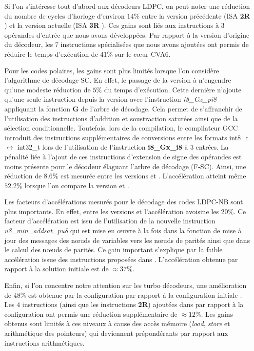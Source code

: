 \documentclass[../main.tex]{subfiles}
\begin{document}
Si l'on s'intéresse tout d'abord aux décodeurs LDPC, on peut noter une réduction du nombre de cycles d'horloge d'environ  $14\%$ entre la version précédente (ISA \textbf{2R} ) et la version actuelle (ISA \textbf{3R} ). 
Ces gains sont liés aux instructions à $3$ opérandes d'entrée que nous avons développées.
Par rapport à la version d'origine du décodeur, les $7$ instructions spécialisées que nous avons ajoutées ont permis de réduire le temps d'exécution de $41\%$ sur le cœur CVA6.


Pour les codes polaires, les gains sont plus limités lorsque l'on considère l'algorithme de décodage SC. 
En effet, le passage de la version  à  n'engendre qu'une modeste réduction de $5\%$ du temps d'exécution. 
Cette dernière n'ajoute qu'une seule instruction depuis la version  avec l'instruction \textit{i8\_Gx\_pi8} appliquant la fonction \textbf{G} de l'arbre de décodage.
Cela permet de s'affranchir de l'utilisation des instructions d'addition et soustraction saturées ainsi que de la sélection conditionnelle. 
Toutefois, lors de la compilation, le compilateur GCC introduit des instructions supplémentaires de conversions entre les formats int8\_t $\leftrightarrow$ int32\_t lors de l'utilisation de l'instruction \textbf{i8\_Gx\_i8} à 3 entrées.
La pénalité liée à l'ajout de ces instructions d'extension de signe des opérandes est moins présente pour le décodeur élaguant l'arbre de décodage (F-SC).
Ainsi, une réduction de $8.6\%$ est mesurée entre les versions  et .
L'accélération atteint même $52.2\%$ lorsque l'on compare la version  et .


Les facteurs d'accélérations mesurés pour le décodage des codes LDPC-NB sont plus importants.
En effet, entre les versions  et  l'accélération avoisine les $20\%$.
Ce facteur d'accélération est issu de l'utilisation de la nouvelle instruction \textit{u8\_min\_addsat\_pu8} qui est mise en œuvre à la fois dans la fonction de mise à jour des messages des nœuds de variables vers les nœuds de parités ainsi que dans le calcul des nœuds de parités.
Ce gain important s'explique par la faible accélération issue des instructions proposées dans .
L'accélération obtenue par rapport à la solution initiale  est de $\approx 37\%$.

Enfin, si l'on concentre notre attention sur les turbo décodeurs, une amélioration de $48\%$ est obtenue par la configuration  par rapport à la configuration initiale . 
Les $4$ instructions (ainsi que les instructions \textbf{2R}) ajoutées dans  par rapport à la configuration  ont permis une réduction supplémentaire de $\approx 12\%$.
Les gains obtenus sont limités à ces niveaux à cause des accès mémoire (\textit{load}, \textit{store} et arithmétique des pointeurs) qui deviennent prépondérants par rapport aux instructions arithmétiques.
\end{document}
